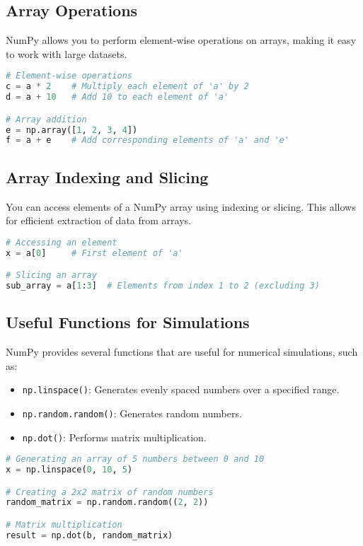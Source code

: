 \subsection{Array Operations}
NumPy allows you to perform element-wise operations on arrays, making it easy to work with large datasets.
\begin{lstlisting}[language=Python, style=mystyle2]
# Element-wise operations
c = a * 2    # Multiply each element of 'a' by 2
d = a + 10   # Add 10 to each element of 'a'

# Array addition
e = np.array([1, 2, 3, 4])
f = a + e    # Add corresponding elements of 'a' and 'e'
\end{lstlisting}

\subsection{Array Indexing and Slicing}
You can access elements of a NumPy array using indexing or slicing. This allows for efficient extraction of data from arrays.
\begin{lstlisting}[language=Python, style=mystyle2]
# Accessing an element
x = a[0]     # First element of 'a'

# Slicing an array
sub_array = a[1:3]  # Elements from index 1 to 2 (excluding 3)
\end{lstlisting}

\subsection{Useful Functions for Simulations}
NumPy provides several functions that are useful for numerical simulations, such as:
\begin{itemize}
    \item \texttt{np.linspace()}: Generates evenly spaced numbers over a specified range.
    \item \texttt{np.random.random()}: Generates random numbers.
    \item \texttt{np.dot()}: Performs matrix multiplication.
\end{itemize}

\begin{lstlisting}[language=Python, style=mystyle2]
# Generating an array of 5 numbers between 0 and 10
x = np.linspace(0, 10, 5)

# Creating a 2x2 matrix of random numbers
random_matrix = np.random.random((2, 2))

# Matrix multiplication
result = np.dot(b, random_matrix)
\end{lstlisting}

